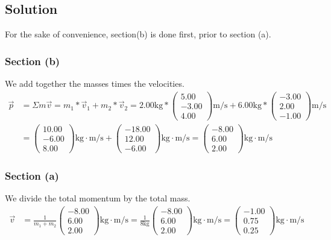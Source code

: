 \documentclass[12pt]{article}
\begin{document}
\subsection*{Solution}
For the sake of convenience, section(b) is done first, prior to section (a).
\subsubsection*{Section (b)}
We add together the masses times the velocities.
\begin{align*}
    \vec{p} &=  \Sigma m\vec{v}   
        =   m_1*\vec{v}_1 + m_2*\vec{v}_2
        =   2.00\unit{\kilo\gram} * \begin{pmatrix}5.00\\-3.00\\4.00\end{pmatrix} \unit{\meter/\second} + 6.00\unit{\kilo\gram} * \begin{pmatrix}-3.00\\2.00\\-1.00\end{pmatrix} \unit{\meter/\second}\\
        &=  \begin{pmatrix}10.00\\-6.00\\8.00\end{pmatrix} \unit{\kilo\gram\cdot\meter/\second} + \begin{pmatrix}-18.00\\12.00\\-6.00\end{pmatrix} \unit{\kilo\gram\cdot\meter/\second}
        =   \boxed{ \begin{pmatrix}-8.00\\6.00\\2.00\end{pmatrix} \unit{\kilogram\cdot\meter/\second} }
\end{align*}

\subsubsection*{Section (a)}
We divide the total momentum by the total mass.
\begin{align*}
    \vec{v} &=  \frac{1}{m_1 + m_2}\begin{pmatrix}-8.00\\6.00\\2.00\end{pmatrix} \unit{\kilogram\cdot\meter/\second}
        =   \frac{1}{8\unit{\kilo\gram}}\begin{pmatrix}-8.00\\6.00\\2.00\end{pmatrix} \unit{\kilogram\cdot\meter/\second}
        =   \boxed{ \begin{pmatrix}-1.00\\0.75\\0.25\end{pmatrix} \unit{\kilogram\cdot\meter/\second} }
\end{align*}
\end{document}
